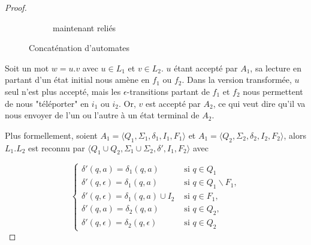 \begin{proof}
\begin{figure*}[ht]
\begin{subfigure}[b]{0.5\textwidth}
\caption{maintenant reliés}
    \end{subfigure}
    \caption{Concaténation d'automates}
    \label{concatscheme}
\end{figure*}

\newpage

Soit un mot $w = u.v$ avec $u \in L_1$ et $v \in L_2$. $u$ étant accepté par $A_1$, sa lecture en partant d'un état initial nous amène en $f_1$ ou $f_2$. Dans la version transformée, $u$ seul n'est plus accepté, mais les $\epsilon$-transitions partant de $f_1$ et $f_2$ nous permettent de nous "téléporter" en $i_1$ ou $i_2$. Or, $v$ est accepté par $A_2$, ce qui veut dire qu'il va nous envoyer de l'un ou l'autre à un état terminal de $A_2$.



Plus formellement, soient $A_1 = \big \langle Q_1, \Sigma_1, \delta_1, I_1, F_1\big \rangle$ et $A_1 = \big \langle Q_2, \Sigma_2, \delta_2, I_2, F_2\big \rangle$, alors $L_1.L_2$ est reconnu par $\big \langle Q_1 \cup Q_2, \Sigma_1 \cup \Sigma_2, \delta', I_1, F_2\big \rangle$ avec 

\[
\begin{cases}
\delta'(q,a) = \delta_1(q,a) &\text{ si } q \in Q_1 \\[1ex]
\delta'(q,\epsilon) = \delta_1(q,a) &\text{ si } q \in Q_1 \backslash F_1,\\[1ex]
\delta'(q,\epsilon) = \delta_1(q,a) \cup I_2 &\text{ si } q \in F_1,\\[1ex]
\delta'(q,a) = \delta_2(q,a) &\text{ si } q \in Q_2,\\[1ex]
\delta'(q,\epsilon) = \delta_2(q,\epsilon) &\text{ si } q \in Q_2
\end{cases}
\]


\end{proof}
